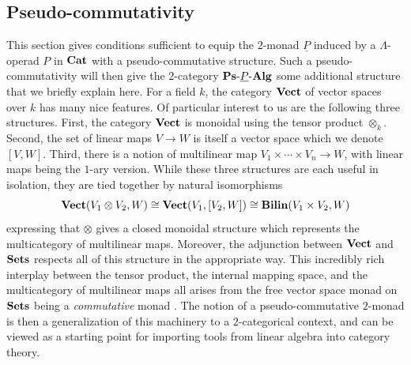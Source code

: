 \subsection{Pseudo-commutativity}

This section gives conditions sufficient to equip the $2$-monad $\underline{P}$ induced by a $\Lambda$-operad $P$ in $\mathbf{Cat}$ with a pseudo-commutative structure. Such a pseudo-commutativity will then give the $2$-category $\mathbf{Ps}\mbox{-}\underline{P}\mbox{-}\mathbf{Alg}$ some additional structure that we briefly explain here. For a field $k$, the category $\mathbf{Vect}$ of vector spaces over $k$ has many nice features. Of particular interest to us are the following three structures. First, the category $\mathbf{Vect}$ is monoidal using the tensor product $\otimes_{k}$. Second, the set of linear maps $V \rightarrow W$ is itself a vector space which we denote $[V,W]$. Third, there is a notion of multilinear map $V_{1} \times \cdots \times V_{n} \rightarrow W$, with linear maps being the $1$-ary version. While these three structures are each useful in isolation, they are tied together by natural isomorphisms
  \[
    \mathbf{Vect}(V_{1} \otimes V_{2}, W) \cong \mathbf{Vect}(V_{1}, [V_{2}, W]) \cong \mathbf{Bilin}(V_{1} \times V_{2}, W)
  \]
expressing that $\otimes$ gives a closed monoidal structure which represents the multicategory of multilinear maps. Moreover, the adjunction between $\mathbf{Vect}$ and $\mathbf{Sets}$ respects all of this structure in the appropriate way. This incredibly rich interplay between the tensor product, the internal mapping space, and the multicategory of multilinear maps all arises from the free vector space monad on $\mathbf{Sets}$ being a \textit{commutative} monad \cite{kock-monads, kock-closed, kock-strong}. The notion of a pseudo-commutative $2$-monad \cite{HP} is then a generalization of this machinery to a $2$-categorical context, and can be viewed as a starting point for importing tools from linear algebra into category theory.


